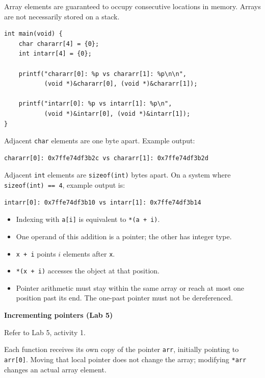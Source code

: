 \documentclass[11pt,a4paper]{article}
\begin{document}
Array elements are guaranteed to occupy consecutive locations in
memory. Arrays are not necessarily stored on a stack.

\begin{lstlisting}[style=cscode]
int main(void) {
    char chararr[4] = {0};
    int intarr[4] = {0};

    printf("chararr[0]: %p vs chararr[1]: %p\n\n",
           (void *)&chararr[0], (void *)&chararr[1]);

    printf("intarr[0]: %p vs intarr[1]: %p\n",
           (void *)&intarr[0], (void *)&intarr[1]);
}
\end{lstlisting}

Adjacent \texttt{char} elements are one byte apart.
Example output:
\begin{lstlisting}[style=plaincode]
chararr[0]: 0x7ffe74df3b2c vs chararr[1]: 0x7ffe74df3b2d
\end{lstlisting}

Adjacent \texttt{int} elements are \texttt{sizeof(int)} bytes apart.
On a system where \texttt{sizeof(int) == 4}, example output is:
\begin{lstlisting}[style=plaincode]
intarr[0]: 0x7ffe74df3b10 vs intarr[1]: 0x7ffe74df3b14
\end{lstlisting}


\begin{itemize}
    \item Indexing with \texttt{a[i]} is equivalent to
          \texttt{*(a + i)}.
    \item One operand of this addition is a pointer; the other has
          integer type.
    \item \texttt{x + i} points \(i\) elements after \texttt{x}.
    \item \texttt{*(x + i)} accesses the object at that position.
    \item Pointer arithmetic must stay within the same array or
          reach at most one position past its end. The one-past
          pointer must not be dereferenced.
\end{itemize}

\textbf{Incrementing pointers (Lab 5)}

Refer to Lab 5, activity 1.

Each function receives its own copy of the pointer \texttt{arr},
initially pointing to \texttt{arr[0]}. Moving that local pointer does
not change the array; modifying \texttt{*arr} changes an actual
array element.
\end{document}

